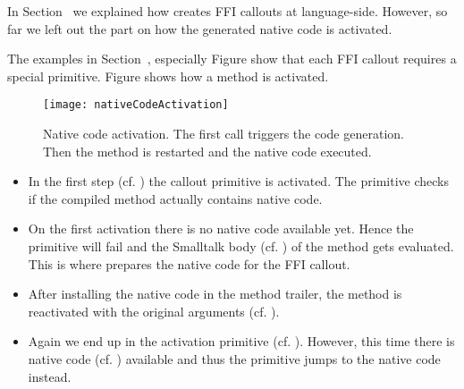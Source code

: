 In Section~ we explained how \NB creates FFI callouts at language-side.
However, so far we left out the part on how the generated native code is activated.

The examples in Section~, especially Figure  show that each \NB FFI callout requires a special primitive.
Figure  shows how a \NB method is activated.


\begin{figure}[h]
	\centering
	\texttt{[image: nativeCodeActivation]}
	\caption{Native code activation. The first call triggers the code generation. Then the method is restarted and the native code executed.}
\end{figure}

\begin{itemize}
\item In the first step (cf. ) the \NB callout primitive is activated.
	The primitive checks if the compiled method actually contains native code.
\item On the first activation there is no native code available yet.
	Hence the primitive will fail and the Smalltalk body (cf. ) of the \NB method gets evaluated.
	This is where \NB prepares the native code for the FFI callout.
\item After installing the native code in the method trailer, the \NB method is reactivated with the original arguments (cf. ).
\item Again we end up in the \NB activation primitive (cf. ).
	However, this time there is native code (cf. ) available and thus the primitive jumps to the native code instead.
\end{itemize}



